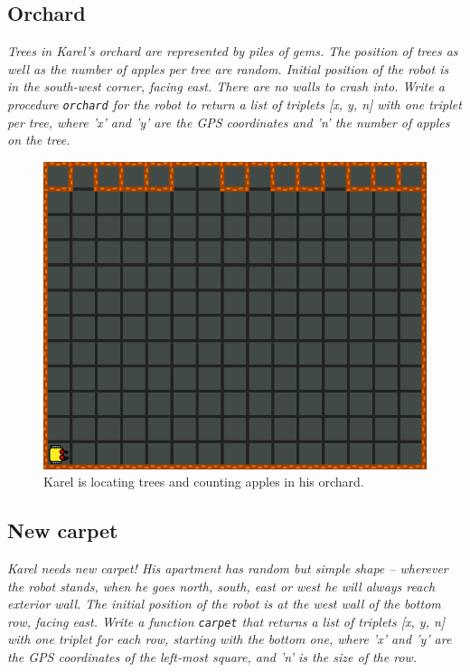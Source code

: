 \subsection{Orchard}

{\em Trees in Karel's orchard are represented by piles of gems. The position of trees as well as the number of apples per tree are random. Initial position of the robot is in the south-west corner, facing east. There are no walls to crash into. Write a procedure {\tt orchard} for the robot to return a list of triplets [x, y, n] with one triplet per tree, where 'x' and 'y' are the GPS coordinates and 'n' the number of apples on the tree.}


\begin{figure}[!ht]
\begin{center}
\includegraphics[height=0.4\textwidth]{img/h03.png}
\end{center}
\vspace{-4mm}
\caption{Karel is locating trees and counting apples in his orchard.}
\label{fig:h03}
\end{figure}


\subsection{New carpet}

{\em Karel needs new carpet! His apartment has random but simple shape -- wherever 
the robot stands, when he goes north, south, east or west he will always reach exterior wall.
The initial position of the robot is at the west wall of the bottom row, facing east. 
Write a function {\tt carpet} that returns a list of triplets [x, y, n] with one triplet for each
row, starting with the bottom one, where 'x' and 'y' are the GPS coordinates of the left-most
square, and 'n' is the size of the row. }
\newpage

